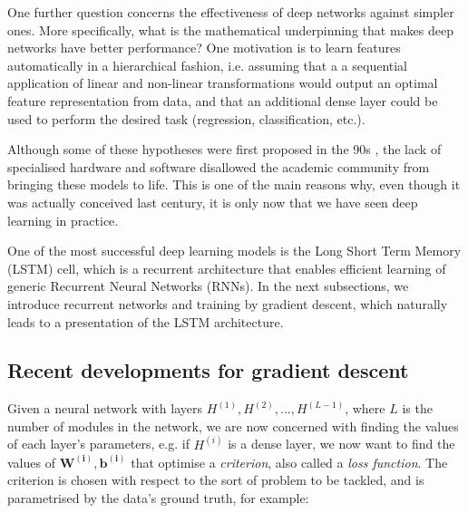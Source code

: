 \documentclass[pdftex,12pt,a4paper]{article}
\theoremstyle{definition}
\theoremstyle{remark}
\newcommand*{\V}[1]{\mathbf{#1}}%
\begin{document}
\par One further question concerns the effectiveness of deep networks against simpler ones. More specifically, what is the mathematical underpinning that makes deep networks have better performance? One motivation is to learn features automatically in a hierarchical fashion, i.e. assuming that a a sequential application of linear and non-linear transformations would output an optimal feature representation from data, and that an additional dense layer could be used to perform the desired task (regression, classification, etc.). 

\par Although some of these hypotheses were first proposed in the 90s \cite{Hochreiter1997}, the lack of specialised hardware and software disallowed the academic community from bringing these models to life. This is one of the main reasons why, even though it was actually conceived last century, it is only now that we have seen deep learning in practice.

\par One of the most successful deep learning models is the Long Short Term Memory (LSTM) cell, which is a recurrent architecture that enables efficient learning of generic Recurrent Neural Networks (RNNs). In the next subsections, we introduce recurrent networks and training by gradient descent, which naturally leads to a presentation of the LSTM architecture.

\subsection{Recent developments for gradient descent}

Given a neural network with layers $H^{(1)}, H^{(2)}, ..., H^{(L-1)}$, where $L$ is the number of modules in the network, we are now concerned with finding the values of each layer's parameters, e.g. if $H^{(i)}$ is a dense layer, we now want to find the values of $\V{W^{(i)}, b^{(i)}}$ that optimise a \textit{criterion}, also called a \textit{loss function}. The criterion is chosen with respect to the sort of problem to be tackled, and is parametrised by the data's ground truth, for example:
\end{document}
